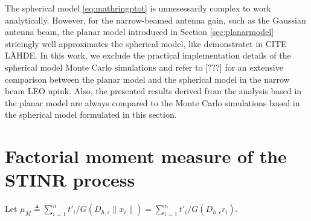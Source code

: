 \documentclass[lettersize,journal]{IEEEtran}
\begin{document}
The spherical model \eqref{eq:mathringptot} is unnesessarily complex to work analytically. However, for the narrow-beamed antenna gain, such as the Gaussian antenna beam, the planar model introduced in Section \ref{sec:planarmodel} stricingly well approximates the spherical model, like demonstratet in CITE LÄHDE. In this work, we exclude the practical implementation details of the spherical model Monte Carlo simulations and refer to [???] for an extensive comparison between the planar model and the spherical model in the narrow beam LEO upink. Also, the presented results derived from the analysis based in the planar model are always compared to the Monte Carlo simulations based in the spherical model formulated in this section.







\appendices

\section{Factorial moment measure of the STINR process}
\label{app:factorialmomentmeasureoftheSTINR}
Let $\mu_M \triangleq \sum_{i=1}^nt'_i/G(D_{h,\epsilon}\|x_i\|)=\sum_{i=1}^nt'_i/G(D_{h,\epsilon} r_i)$.
\end{document}
